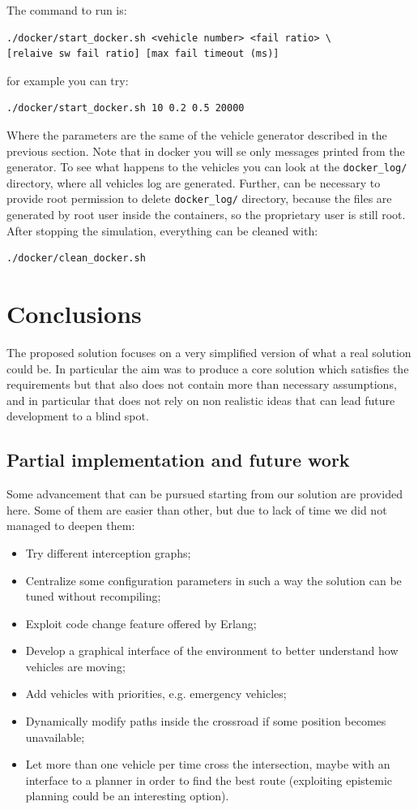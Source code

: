 \documentclass{memoir}
\begin{document}
The command to run is:
\begin{verbatim}
./docker/start_docker.sh <vehicle number> <fail ratio> \
[relaive sw fail ratio] [max fail timeout (ms)]
\end{verbatim}
for example you can try:
\begin{verbatim}
./docker/start_docker.sh 10 0.2 0.5 20000
\end{verbatim}
Where the parameters are the same of the vehicle generator described in the previous section.
Note that in docker you will se only messages printed from the generator. To see what happens to the vehicles you can look at the \verb|docker_log/| directory, where all vehicles log are generated. Further, can be necessary to provide root permission to delete \verb|docker_log/| directory, because the files are generated by root user inside the containers, so the proprietary user is still root.
After stopping the simulation, everything can be cleaned with:
\begin{verbatim}
./docker/clean_docker.sh
\end{verbatim}

\chapter{Conclusions}
The proposed solution focuses on a very simplified version of what a real solution could be. In particular the aim was to produce a core solution which satisfies the requirements but that also does not contain more than necessary assumptions, and in particular that does not rely on non realistic ideas that can lead future development to a blind spot.

\section{Partial implementation and future work}
Some advancement that can be pursued starting from our solution are provided here. Some of them are easier than other, but due to lack of time we did not managed to deepen them:
\begin{itemize}
	\item Try different interception graphs;
	\item Centralize some configuration parameters in such a way the solution can be tuned without recompiling;
	\item Exploit code change feature offered by Erlang;
	\item Develop a graphical interface of the environment to better understand how vehicles are moving;
	\item Add vehicles with priorities, e.g. emergency vehicles;
	\item Dynamically modify paths inside the crossroad if some position becomes unavailable;
	\item Let more than one vehicle per time cross the intersection, maybe with an interface to a planner in order to find the best route (exploiting epistemic planning could be an interesting option).
\end{itemize}
\end{document}

